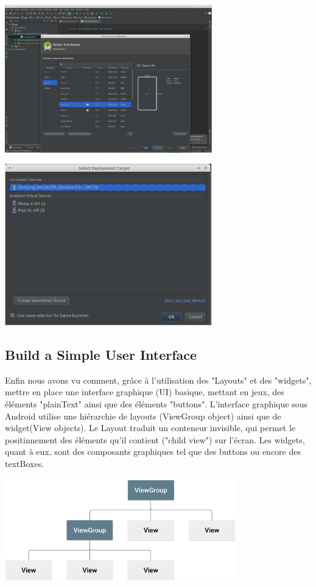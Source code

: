 \documentclass[french,a4paper,12pt]{report}
\begin{document}
\includegraphics[width=9cm]{7.png}

\includegraphics[width=9cm]{121.png}

\subsection{Build a Simple User Interface}

Enfin nous avons vu comment, grâce à l'utilisation des "Layouts" et des "widgets",
mettre en place une interface graphique (UI) basique, mettant en jeux, des éléments
"plainText" ainsi que des éléments "buttons".
\bigbreak
L'interface graphique sous Android utilise une hiérarchie de layouts (ViewGroup object)
ainsi que de widget(View objects).
\smallbreak
Le Layout traduit un conteneur invisible, qui
permet le positinnement des éléments qu'il contient ("child view") sur l'écran.
\smallbreak
Les widgets, quant à eux, sont des composants graphiques tel que des buttons ou
encore des textBoxes.

\includegraphics[width=10cm]{13.png}
\end{document}
